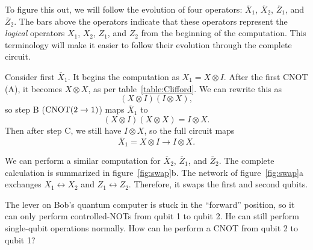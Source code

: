 To figure this out, we will follow the evolution of four operators:
$\overline{X}_1$, $\overline{X}_2$, $\overline{Z}_1$, and
$\overline{Z}_2$.  The bars above the operators indicate that these
operators represent the {\em logical} operators $X_1$, $X_2$, $Z_1$,
and $Z_2$ from the beginning of the computation.  This terminology
will make it easier to follow their evolution through the complete
circuit.

Consider first $\overline{X}_1$.  It begins the computation as $X_1 =
X \otimes I$.  After the first CNOT (A), it becomes $X \otimes X$, as
per table~\ref{table:Clifford}.  We can rewrite this as
\begin{equation}
\left( X \otimes I \right) \left( I \otimes X \right),
\end{equation}
so step B (${\rm CNOT}(2 \rightarrow 1)$) maps $\overline{X}_1$ to
\begin{equation}
\left( X \otimes I \right) \left( X \otimes X \right) = I \otimes X.
\end{equation}
Then after step C, we still have $I \otimes X$, so the full circuit
maps
\begin{equation}
\overline{X}_1 = X \otimes I \rightarrow I \otimes X.
\end{equation}

We can perform a similar computation for $\overline{X}_2$,
$\overline{Z}_1$, and $\overline{Z}_2$.  The complete calculation is
summarized in figure~\ref{fig:swap}b.  The network of figure~\ref{fig:swap}a 
exchanges $X_1 \leftrightarrow X_2$ and $Z_1 \leftrightarrow Z_2$.  Therefore, 
it swaps the first and second qubits.

\begin{example}
The lever on Bob's quantum computer is stuck in the ``forward''
position, so it can only perform controlled-NOTs from qubit 1 to qubit
2.  He can still perform single-qubit operations normally.  How can he
perform a CNOT from qubit 2 to qubit 1?
\end{example}

